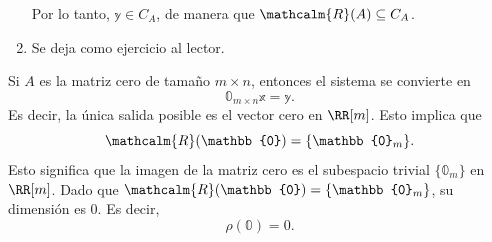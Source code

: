 \begin{theorem}{}{}
\begin{enumerate}[label=\roman*), topsep=6pt, itemsep=0pt]
\begin{matrizn}
        \end{matrizn}
        Por lo tanto, $\mathbb{y} \in C_A$, de manera que $\mathcalm{R}(A) \subseteq C_A$.
        \item Se deja como ejercicio al lector.
    \end{enumerate}
\end{theorem}

Si $A$ es la matriz cero de tamaño $m \times n$, entonces el sistema se convierte en
$$\mathbb{0}_{m \times n} \mathbb{x} = \mathbb{y}.$$
Es decir, la única salida posible es el vector cero en $\RR[m]$. Esto implica que
$$\mathcalm{R}(\mathbb{0}) = \{\mathbb{0}_m\}.$$
Esto significa que la imagen de la matriz cero es el subespacio trivial $\{\mathbb{0}_m\}$ en $\RR[m]$. Dado que $\mathcalm{R}(\mathbb{0}) = \{\mathbb{0}_m\}$, su dimensión es 0. Es decir,
$$\rho(\mathbb{0}) = 0.$$

\newpage

